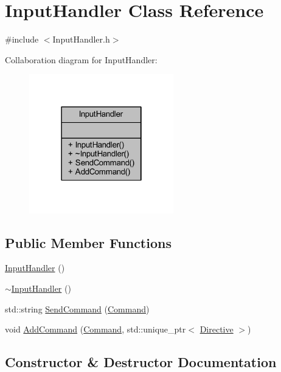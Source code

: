 \hypertarget{class_input_handler}{}\section{Input\+Handler Class Reference}
\label{class_input_handler}


{\ttfamily \#include $<$Input\+Handler.\+h$>$}



Collaboration diagram for Input\+Handler\+:\nopagebreak
\begin{figure}[H]
\begin{center}
\leavevmode
\includegraphics[width=178pt]{class_input_handler__coll__graph}
\end{center}
\end{figure}
\subsection*{Public Member Functions}
\begin{DoxyCompactItemize}
\item 
\mbox{\hyperlink{class_input_handler_a698aa4af4f326a9881835fda251ca996}{Input\+Handler}} ()
\item 
\mbox{\hyperlink{class_input_handler_ac1f7efb54b34d433d6ffba62627452b6}{$\sim$\+Input\+Handler}} ()
\item 
std\+::string \mbox{\hyperlink{class_input_handler_a56716403455708430c7c5e65e44cb118}{Send\+Command}} (\mbox{\hyperlink{_commands_8h_a16664d91c016c57e51eff6cbd28e32cf}{Command}})
\item 
void \mbox{\hyperlink{class_input_handler_ada312ad1f3af7ee1742f11d353185961}{Add\+Command}} (\mbox{\hyperlink{_commands_8h_a16664d91c016c57e51eff6cbd28e32cf}{Command}}, std\+::unique\+\_\+ptr$<$ \mbox{\hyperlink{class_directive}{Directive}} $>$)
\end{DoxyCompactItemize}


\subsection{Constructor \& Destructor Documentation}
\mbox{\label{class_input_handler_a698aa4af4f326a9881835fda251ca996}} 
